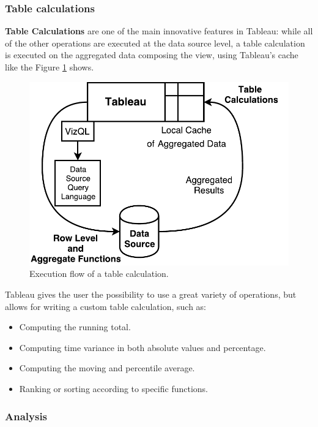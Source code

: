 \subsubsection{Table calculations}

\textbf{Table Calculations} are one of the main innovative features in Tableau: while all of the other operations are executed at the data source level, a table calculation is executed on the aggregated data composing the view, using Tableau's cache like the Figure \ref{fig:TableCalculation} shows.


\begin{figure}[ht]
    \begin{center}
        \includegraphics[width=0.8\linewidth]{Figures/TableCalculation}
    \end{center}
    \caption{Execution flow of a table calculation.}
    \label{fig:TableCalculation}
\end{figure}

Tableau gives the user the possibility to use a great variety of operations, but allows for writing a custom table calculation, such as:

\begin{itemize}
    \item Computing the running total.
    \item Computing time variance in both absolute values and percentage.
    \item Computing the moving and percentile average.
    \item Ranking or sorting according to specific functions.
\end{itemize}

\subsubsection{Analysis}

